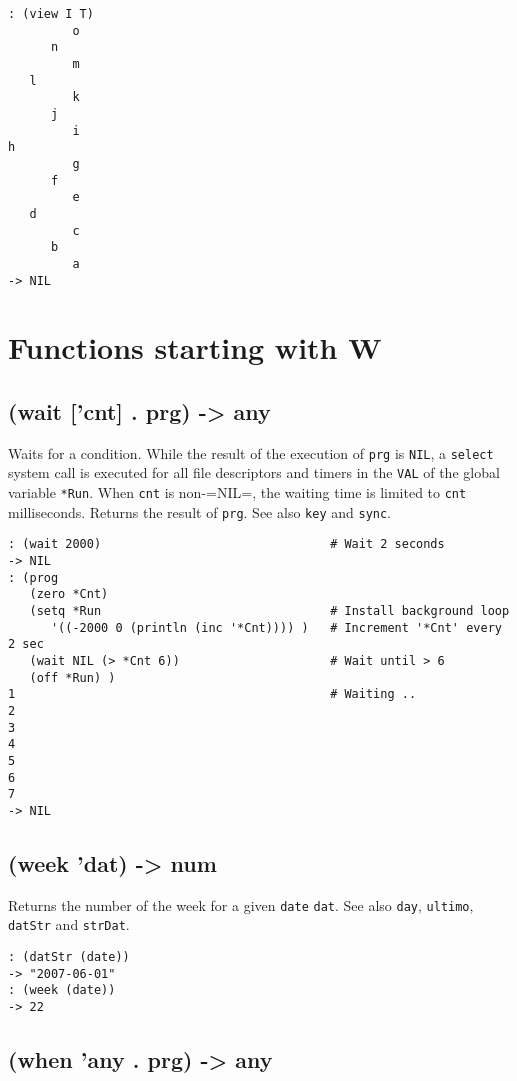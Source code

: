 {{{{{{{{\begin{verbatim}
: (view I T)
         o
      n
         m
   l
         k
      j
         i
h
         g
      f
         e
   d
         c
      b
         a
-> NIL
\end{verbatim}


\chapter{Functions starting with W}
\label{sec-8-1-23}

 
\section{(wait ['cnt] . prg) -> any}
\label{sec-8-1-23-1}


Waits for a condition. While the result of the execution of \texttt{prg} is
\texttt{NIL}, a \texttt{select} system call is executed for all file descriptors and
timers in the \texttt{VAL} of the global variable \texttt{*Run}. When \texttt{cnt} is
non-=NIL=, the waiting time is limited to \texttt{cnt} milliseconds. Returns
the result of \texttt{prg}. See also \texttt{key} and \texttt{sync}.


\begin{verbatim}
: (wait 2000)                                # Wait 2 seconds
-> NIL
: (prog
   (zero *Cnt)
   (setq *Run                                # Install background loop
      '((-2000 0 (println (inc '*Cnt)))) )   # Increment '*Cnt' every 2 sec
   (wait NIL (> *Cnt 6))                     # Wait until > 6
   (off *Run) )
1                                            # Waiting ..
2
3
4
5
6
7
-> NIL
\end{verbatim}

 
\section{(week 'dat) -> num}
\label{sec-8-1-23-2}


Returns the number of the week for a given \texttt{date} \texttt{dat}. See also \texttt{day},
\texttt{ultimo}, \texttt{datStr} and \texttt{strDat}.


\begin{verbatim}
: (datStr (date))
-> "2007-06-01"
: (week (date))
-> 22
\end{verbatim}

 
\section{(when 'any . prg) -> any}
\label{sec-8-1-23-3}


}}}}}}}}
